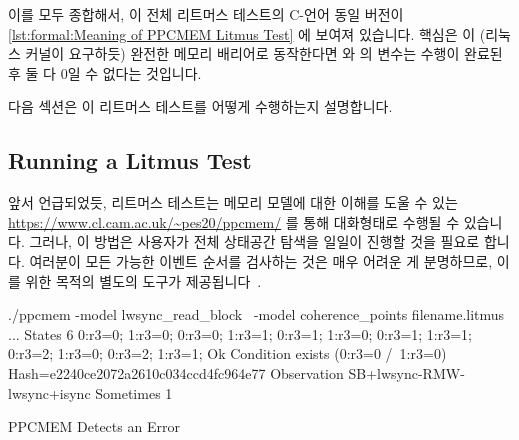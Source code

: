 이를 모두 종합해서, 이 전체 리트머스 테스트의 C-언어 동일 버전이
\cref{lst:formal:Meaning of PPCMEM Litmus Test} 에 보여져 있습니다.
핵심은  이 (리눅스 커널이 요구하듯) 완전한 메모리
배리어로 동작한다면  와  의  변수는 수행이 완료된 후 둘
다 0일 수 없다는 것입니다.

다음 섹션은 이 리트머스 테스트를 어떻게 수행하는지 설명합니다.

\iffalse

Putting all this together, the C-language equivalent to the entire litmus
test is as shown in
\cref{lst:formal:Meaning of PPCMEM Litmus Test}.
The key point is that if \co{atomic_add_return()} acts as a full
memory barrier (as the Linux kernel requires it to), 
then it should be impossible for \co{P0()}'s and \co{P1()}'s \co{r3}
variables to both be zero after execution completes.

The next section describes how to run this litmus test.

\fi

\subsection{Running a Litmus Test}
\label{sec:formal:Running a Litmus Test}

앞서 언급되었듯, 리트머스 테스트는 메모리 모델에 대한 이해를 도울 수 있는
\url{https://www.cl.cam.ac.uk/~pes20/ppcmem/} 를 통해 대화형태로 수행될 수
있습니다.
그러나, 이 방법은 사용자가 전체 상태공간 탐색을 일일이 진행할 것을 필요로
합니다.
여러분이 모든 가능한 이벤트 순서를 검사하는 것은 매우 어려운 게 분명하므로,
이를 위한 목적의 별도의 도구가 제공됩니다~\cite{PaulEMcKenney2011ppcmem}.

\iffalse

As noted earlier, litmus tests may be run interactively via
\url{https://www.cl.cam.ac.uk/~pes20/ppcmem/}, which can help build an
understanding of the memory model.
However, this approach requires that the user manually carry out the
full state-space search.
Because it is very difficult to be sure that you have checked every
possible sequence of events, a separate tool is provided for this
purpose~\cite{PaulEMcKenney2011ppcmem}.

\fi

\begin{listing}[tbp]
\begin{VerbatimL}[numbers=none,xleftmargin=0pt]
./ppcmem -model lwsync_read_block \
         -model coherence_points filename.litmus
...
States 6
0:r3=0; 1:r3=0;
0:r3=0; 1:r3=1;
0:r3=1; 1:r3=0;
0:r3=1; 1:r3=1;
0:r3=2; 1:r3=0;
0:r3=2; 1:r3=1;
Ok
Condition exists (0:r3=0 /\ 1:r3=0)
Hash=e2240ce2072a2610c034ccd4fc964e77
Observation SB+lwsync-RMW-lwsync+isync Sometimes 1
\end{VerbatimL}
\caption{PPCMEM Detects an Error}
\label{lst:formal:PPCMEM Detects an Error}
\end{listing}


